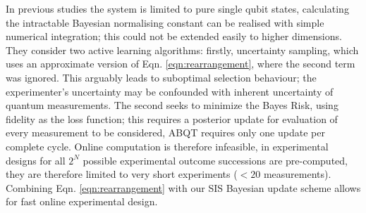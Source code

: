 \documentclass[aps,twocolumn,prl]{revtex4-1}
\begin{document}
In previous studies \cite{SelfLearning} the system is limited to pure single qubit states, calculating the intractable Bayesian normalising constant can be realised with simple numerical integration; this could not be extended easily to higher dimensions. They consider two active learning algorithms: firstly, uncertainty sampling, which uses an approximate version of Eqn. \eqref{eqn:rearrangement}, where the second term was ignored. This arguably leads to suboptimal selection behaviour; the experimenter's uncertainty may be confounded with inherent uncertainty of quantum measurements. The second seeks to minimize the Bayes Risk, using fidelity as the loss function; this requires a posterior update for evaluation of every measurement to be considered, ABQT requires only one update per complete cycle. Online computation is therefore infeasible, in \cite{SelfLearningExperimental} experimental designs for all $2^N$ possible experimental outcome successions are pre-computed, they are therefore limited to very short experiments ($< 20$ measurements). Combining Eqn. \eqref{eqn:rearrangement} with our SIS Bayesian update scheme allows for fast online experimental design.
\end{document}
